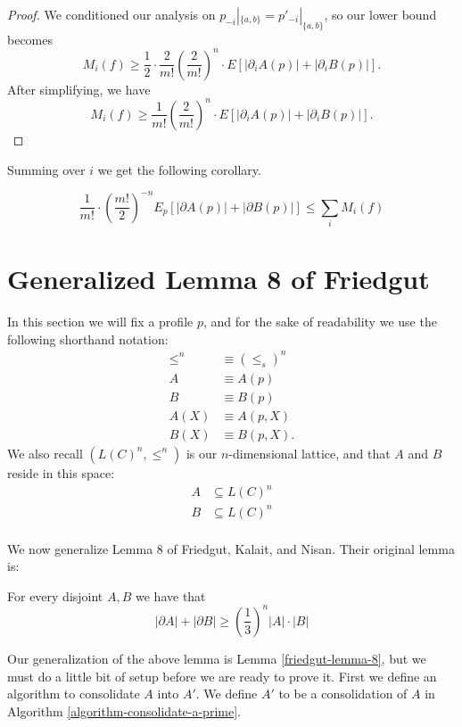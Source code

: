 \begin{proof}
		We conditioned our analysis on $p_{-i}|_{\{a,b\}} = p'_{-i}|_{\{a,b\}}$, so our lower bound becomes
		\[
			M_i(f) \ge \frac{1}{2} \cdot \frac{2}{m!}\left(\frac{2}{m!}\right)^{n} \cdot E \left[ |\partial_i A(p)| + |\partial_i B(p)| \right].
		\]
		After simplifying, we have
		\[
			M_i(f) \ge \frac{1}{m!}\left(\frac{2}{m!}\right)^{n} \cdot E \left[ |\partial_i A(p)| + |\partial_i B(p)| \right].
		\]
	\end{proof}

	Summing over $i$ we get the following corollary.

	\begin{corollary}
		\[
			\frac{1}{m!} \cdot \left(\frac{m!}{2}\right)^{-n} E_p[|\partial A(p)| + |\partial B(p)|] \le \sum_i M_i(f)
		\]
	\end{corollary}


\section{Generalized Lemma 8 of Friedgut}

	In this section we will fix a profile $p$, and for the sake of readability we use the following shorthand notation:
	\begin{align*}
		\le^n &\equiv (\le_s)^n \\
		A &\equiv A(p) \\
		B &\equiv B(p) \\
		A(X) &\equiv A(p, X) \\
		B(X) &\equiv B(p, X).
	\end{align*}
	We also recall $(L(C)^n, \le^n)$ is our $n$-dimensional lattice, and that $A$ and $B$ reside in this space:
	\begin{align*}
		A &\subseteq L(C)^n \\
		B &\subseteq L(C)^n \\
	\end{align*}

	We now generalize Lemma 8 of Friedgut, Kalait, and Nisan. Their original lemma is:

	\begin{lemma}
		For every disjoint $A, B$ we have that
		\[
			|\partial A| + |\partial B| \ge \left( \frac{1}{3} \right)^n |A| \cdot |B|
		\]
	\end{lemma}

	Our generalization of the above lemma is Lemma \ref{friedgut-lemma-8}, but we must do a little bit of setup before we are ready to prove it. First we define an algorithm to consolidate $A$ into $A'$. We define $A'$ to be a consolidation of $A$ in Algorithm \ref{algorithm-consolidate-a-prime}.

